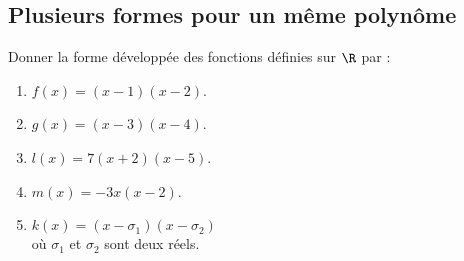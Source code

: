 \documentclass[a4paper,11pt,exos]{nsi} %
\begin{document}
\maketitle

\subsection*{Plusieurs formes pour un même polynôme}

\exo{}
\textcolor{UGLiBlue}{
Donner la forme développée des fonctions définies sur $\R$ par :
\begin{multicols}{3}
	\begin{enumerate}[label=\textbullet]
		\item 	$f(x)=(x-1)(x-2)$.
		\item 	$g(x)=(x-3)(x-4)$.
		\item	$l(x)=7(x+2)(x-5)$.
		\item 	$m(x)=-3x(x-2)$.
		\item 	$k(x)=(x-\sigma_1)(x-\sigma_2)$ \\où $\sigma_1$ et $\sigma_2$ sont deux réels.\columnbreak
	\end{enumerate}
\end{multicols}}
\end{document}
